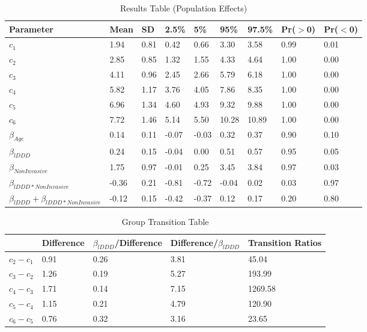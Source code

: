 \documentclass[11pt,twoside]{article}
\numberwithin{Theorem}{section}
\numberwithin{Definition}{section}
\numberwithin{Lemma}{section}
\numberwithin{Algorithm}{section}
\numberwithin{equation}{section}
\begin{document}
\begin{table}[h!]
	\centering
	\begin{tabular}{lllllllll}
		\hline
		Parameter & Mean & SD & 2.5\% & 5\% & 95\% & 97.5\% & Pr($>$0) & Pr($<$0) \\ 
		\hline \hline
		$c_1$ & 1.94 & 0.81 & 0.42 & 0.66 & 3.30 & 3.58 & 0.99 & 0.01 \\ 
		$c_2$ & 2.85 & 0.85 & 1.32 & 1.55 & 4.33 & 4.64 & 1.00 & 0.00 \\ 
		$c_3$ & 4.11 & 0.96 & 2.45 & 2.66 & 5.79 & 6.18 & 1.00 & 0.00 \\ 
		$c_4$ & 5.82 & 1.17 & 3.76 & 4.05 & 7.86 & 8.35 & 1.00 & 0.00 \\ 
		$c_5$ & 6.96 & 1.34 & 4.60 & 4.93 & 9.32 & 9.88 & 1.00 & 0.00 \\ 
		$c_6$ & 7.72 & 1.46 & 5.14 & 5.50 & 10.28 & 10.89 & 1.00 & 0.00 \\ 
		$\beta_{Age}$ & 0.14 & 0.11 & -0.07 & -0.03 & 0.32 & 0.37 & 0.90 & 0.10 \\ 
		$\beta_{lDDD}$ & 0.24 & 0.15 & -0.04 & 0.00 & 0.51 & 0.57 & 0.95 & 0.05 \\ 
		$\beta_{NonInvasive}$ & 1.75 & 0.97 & -0.01 & 0.25 & 3.45 & 3.84 & 0.97 & 0.03 \\ 
		$\beta_{lDDD*NonInvasive}$ & -0.36 & 0.21 & -0.81 & -0.72 & -0.04 & 0.02 & 0.03 & 0.97 \\ 
		$\beta_{lDDD} + \beta_{lDDD*NonInvasive}$ & -0.12 & 0.15 & -0.42 & -0.37 & 0.12 & 0.17 & 0.20 & 0.80 \\ 
		\hline
		\hline
	\end{tabular}
	\caption{Results Table (Population Effects)} 
	\label{tab::5_Results_DDD}
\end{table}


\begin{table}[h!]
	\centering
	\begin{tabular}{lllll}
		\hline
		& Difference & $\beta_{lDDD}$/Difference & Difference/$\beta_{lDDD}$ & Transition Ratios \\ 
		\hline \hline
		$c_2 - c_1$ & 0.91 & 0.26 & 3.81 & 45.04 \\ 
		$c_3 - c_2$ & 1.26 & 0.19 & 5.27 & 193.99 \\ 
		$c_4 - c_3$ & 1.71 & 0.14 & 7.15 & 1269.58 \\ 
		$c_5 - c_4$ & 1.15 & 0.21 & 4.79 & 120.90 \\ 
		$c_6 - c_5$ & 0.76 & 0.32 & 3.16 & 23.65 \\ 
		\hline
	\end{tabular}
	\caption{Group Transition Table} 
	\label{tab::5_Transition_DDD}
\end{table}
\end{document}
